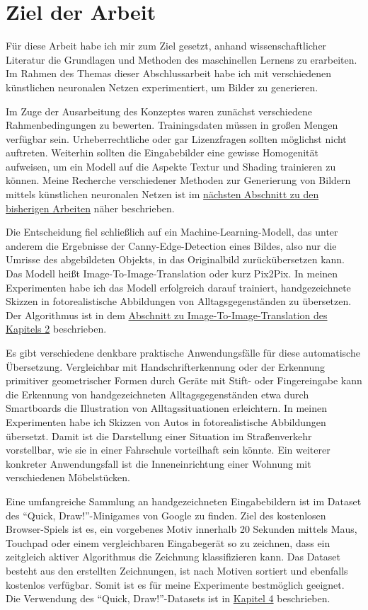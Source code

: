 \section{Ziel der Arbeit}
\label{sec:ziel}
Für diese Arbeit habe ich mir zum Ziel gesetzt, anhand wissenschaftlicher Literatur die Grundlagen und Methoden des maschinellen Lernens zu erarbeiten. Im Rahmen des Themas dieser Abschlussarbeit habe ich mit verschiedenen künstlichen neuronalen Netzen experimentiert, um Bilder zu generieren.

Im Zuge der Ausarbeitung des Konzeptes waren zunächst verschiedene Rahmenbedingungen zu bewerten. Trainingsdaten müssen in großen Mengen verfügbar sein. Urheberrechtliche oder gar Lizenzfragen sollten möglichst nicht auftreten. Weiterhin sollten die Eingabebilder eine gewisse Homogenität aufweisen, um ein Modell auf die Aspekte Textur und Shading trainieren zu können. Meine Recherche verschiedener Methoden zur Generierung von Bildern mittels künstlichen neuronalen Netzen ist im \hyperref[sec:related]{nächsten Abschnitt zu den bisherigen Arbeiten} näher beschrieben.

Die Entscheidung fiel schließlich auf ein Machine-Learning-Modell, das unter anderem die Ergebnisse der Canny-Edge-Detection \cite{canny1986edge} eines Bildes, also nur die Umrisse des abgebildeten Objekts, in das Originalbild zurückübersetzen kann. Das Modell heißt Image-To-Image-Translation \cite{isola2018imagetoimage} oder kurz Pix2Pix. In meinen Experimenten habe ich das Modell erfolgreich darauf trainiert, handgezeichnete Skizzen in fotorealistische Abbildungen von Alltagsgegenständen zu übersetzen. Der Algorithmus ist in dem \hyperref[sec:pix2pix]{Abschnitt zu Image-To-Image-Translation des Kapitels 2} beschrieben.

Es gibt verschiedene denkbare praktische Anwendungsfälle für diese automatische Übersetzung. Vergleichbar mit Handschrifterkennung oder der Erkennung primitiver geometrischer Formen durch Geräte mit Stift- oder Fingereingabe kann die Erkennung von handgezeichneten Alltagsgegenständen etwa durch Smartboards die Illustration von Alltagssituationen erleichtern. In meinen Experimenten habe ich Skizzen von Autos in fotorealistische Abbildungen übersetzt. Damit ist die Darstellung einer Situation im Straßenverkehr vorstellbar, wie sie in einer Fahrschule vorteilhaft sein könnte. Ein weiterer konkreter Anwendungsfall ist die Inneneinrichtung einer Wohnung mit verschiedenen Möbelstücken.

Eine umfangreiche Sammlung an handgezeichneten Eingabebildern ist im Dataset des ``Quick, Draw!''-Minigames von Google zu finden. Ziel des kostenlosen Browser-Spiels ist es, ein vorgebenes Motiv innerhalb 20 Sekunden mittels Maus, Touchpad oder einem vergleichbaren Eingabegerät so zu zeichnen, dass ein zeitgleich aktiver Algorithmus die Zeichnung klassifizieren kann. Das Dataset besteht aus den erstellten Zeichnungen, ist nach Motiven sortiert und ebenfalls kostenlos verfügbar. Somit ist es für meine Experimente bestmöglich geeignet. Die Verwendung des ``Quick, Draw!''-Datasets ist in \hyperref[ch:conduct]{Kapitel 4} beschrieben.

